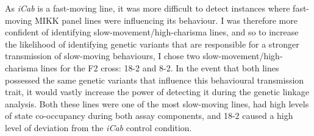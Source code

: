 \documentclass[
]{book}
\begin{document}
As \emph{\textcolor{iCab_424B4D}{iCab}} is a fast-moving line, it was more difficult to detect instances where fast-moving MIKK panel lines were influencing its behaviour. I was therefore more confident of identifying slow-movement/high-charisma lines, and so to increase the likelihood of identifying genetic variants that are responsible for a stronger transmission of slow-moving behaviours, I chose two slow-movement/high-charisma lines for the F2 cross: \textcolor{18-2_FF66A6}{18-2} and \textcolor{8-2_FF699C}{8-2}. In the event that both lines possessed the same genetic variants that influence this behavioural transmission trait, it would vastly increase the power of detecting it during the genetic linkage analysis. Both these lines were one of the most slow-moving lines, had high levels of state co-occupancy during both assay components, and \textcolor{18-2_FF66A6}{18-2} caused a high level of deviation from the \emph{\textcolor{iCab_424B4D}{iCab}} control condition.
\end{document}
